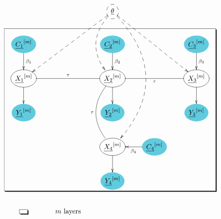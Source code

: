 \documentclass[12pt]{article}
\begin{document}
\begin{figure}[h!]\centering
$$\xymatrix{
&&*++[o][F--]{\underline{\theta}}\ar@[black]@{-->}[ddll]\ar@[black]@{-->}@/_2pc/[dd]\ar@[black]@{-->}[ddrr]\ar@[black]@{-->}@/^4pc/[dddd]&&
\\
*++[o][F*:SkyBlue]{\underline{C_1}^{[m]}}\ar@[black][d]^{\color{black} \beta_1}&&*++[o][F*:SkyBlue]{\underline{C_2}^{[m]}}\ar@[black][d]^{\color{black} \beta_2}&&*++[o][F*:SkyBlue]{\underline{C_3}^{[m]}}\ar@[black][d]^{\color{black} \beta_3}
\\
*++[o][F]{\underline{X_1}^{[m]}}\ar@[black]@{-}[rr]^{\color{black} \tau}\ar[d]&&*++[o][F]{\underline{X_2}^{[m]}}\ar@[black]@{-}[rr]_{\color{black} \tau}\ar@[black]@{-}@/_2pc/[dd]_{\color{black} \tau}\ar[d]&&*++[o][F]{\underline{X_3}^{[m]}}\ar[d]
\\
*++[o][F*:SkyBlue]{\underline{Y_1}^{[m]}}&&*++[o][F*:SkyBlue]{\underline{Y_2}^{[m]}}&&*++[o][F*:SkyBlue]{\underline{Y_3}^{[m]}}
\\
&&*++[o][F]{\underline{X_4}^{[m]}}\ar[d]&*++[o][F*:SkyBlue]{\underline{C_4}^{[m]}}\ar@[black][l]^{\color{black} \beta_4}&
\\
&&*++[o][F*:SkyBlue]{\underline{Y_4}^{[m]}}&&
\save
\POS"2,1"."6,1"."2,5"."6,5"!C*+<2.0em>\frm{-,}
\restore
\\
*+[F-,]{\;\;}&\text{$m$ layers}
}$$
\caption{}
\label{fig-texnn-for-gmrf2}
\end{figure}
\end{document}
